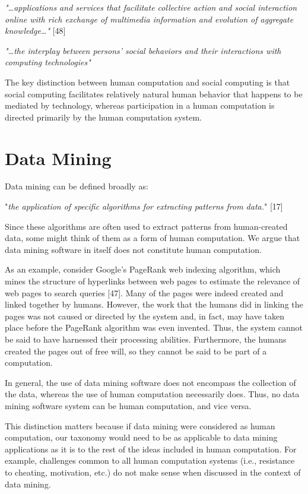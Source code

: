\documentclass{acm_proc_article-sp}
\begin{document}
\textit{"\dots applications and services that facilitate collective action and social interaction online with rich exchange of multimedia information and evolution of aggregate knowledge\dots "} [48]

\textit{"\dots the interplay between persons' social behaviors and their interactions with computing technologies"} ~\cite{cooper2010pre}

The key distinction between human computation and social computing is that social computing facilitates relatively natural human behavior that happens to be mediated by technology, whereas participation in a human computation is directed primarily by the human computation system.
\section*{Data Mining}
Data mining can be defined broadly as:

"\textit{the application of specific algorithms for extracting patterns from data.}" [17]

Since these algorithms are often used to extract patterns from human-created data, some might think of them as a form of human computation. We argue that data mining software in itself does not constitute human computation.

As an example, consider Google's PageRank web indexing algorithm, which mines the structure of hyperlinks between web pages to estimate the relevance of web pages to search queries [47]. Many of the pages were indeed created and linked together by humans. However, the work that the humans did in linking the pages was not caused or directed by the system and, in fact, may have taken place before the PageRank algorithm was even invented. Thus, the system cannot be said to have harnessed their processing abilities. Furthermore, the humans created the pages out of free will, so they cannot be said to be part of a computation.

In general, the use of data mining software does not encompass the collection of the data, whereas the use of human computation necessarily does. Thus, no data mining software system can be human computation, and vice versa.

This distinction matters because if data mining were considered as human computation, our taxonomy would need to be as applicable to data mining applications as it is to the rest of the ideas included in human computation. For example, challenges common to all human computation systems (i.e., resistance to cheating, motivation, etc.) do not make sense when discussed in the context of data mining.
\end{document}
